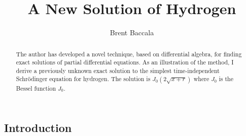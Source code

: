 \documentclass{article}
\title{A New Solution of Hydrogen}
\author{Brent Baccala}
\begin{document}
\parindent 0pt

\maketitle

\begin{abstract}
The author has developed a novel technique, based on differential algebra,
for finding exact solutions of partial
differential equations.  As an illustration of the method,
I derive a previously unknown exact solution to the simplest time-independent Schr\"odinger equation for hydrogen.
The solution is $J_0(2\sqrt{x+r})$ where $J_0$ is the Bessel function $J_0$.
\end{abstract}


\subsection*{Introduction}
\parskip 12pt

\end{document}
